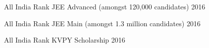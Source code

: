 \begin{cvhonors}

 \cvhonor
  {\ifdefined \ONEPAGE \else All India \fi Rank }
  {JEE Advanced (amongst 120,000 candidates)}
  {}
  {2016}

  \cvhonor
  {\ifdefined \ONEPAGE \else All India \fi  Rank }
  {JEE Main (amongst 1.3 million candidates)}
  {}
  {2016}

  \cvhonor
  {All India Rank }
  {KVPY Scholarship}
  {}
  {2016}

\end{cvhonors}

